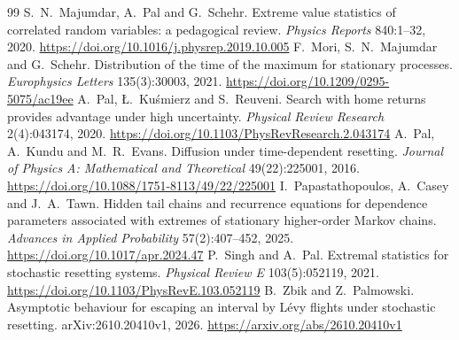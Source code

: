 \documentclass[11pt,a4paper]{article}
\begin{document}
\begin{thebibliography}{99}
 S.~N.~Majumdar, A.~Pal and G.~Schehr. Extreme value statistics of correlated random variables: a pedagogical review. \emph{Physics Reports} 840:1--32, 2020. \url{https://doi.org/10.1016/j.physrep.2019.10.005}
 F.~Mori, S.~N.~Majumdar and G.~Schehr. Distribution of the time of the maximum for stationary processes. \emph{Europhysics Letters} 135(3):30003, 2021. \url{https://doi.org/10.1209/0295-5075/ac19ee}
 A.~Pal, \L.~Ku\'smierz and S.~Reuveni. Search with home returns provides advantage under high uncertainty. \emph{Physical Review Research} 2(4):043174, 2020. \url{https://doi.org/10.1103/PhysRevResearch.2.043174}
 A.~Pal, A.~Kundu and M.~R.~Evans. Diffusion under time-dependent resetting. \emph{Journal of Physics A: Mathematical and Theoretical} 49(22):225001, 2016. \url{https://doi.org/10.1088/1751-8113/49/22/225001}
 I.~Papastathopoulos, A.~Casey and J.~A.~Tawn. Hidden tail chains and recurrence equations for dependence parameters associated with extremes of stationary higher-order Markov chains. \emph{Advances in Applied Probability} 57(2):407--452, 2025. \url{https://doi.org/10.1017/apr.2024.47}
 P.~Singh and A.~Pal. Extremal statistics for stochastic resetting systems. \emph{Physical Review E} 103(5):052119, 2021. \url{https://doi.org/10.1103/PhysRevE.103.052119}
 B.~Zbik and Z.~Palmowski. Asymptotic behaviour for escaping an interval by L\'evy flights under stochastic resetting. arXiv:2610.20410v1, 2026. \url{https://arxiv.org/abs/2610.20410v1}
\end{thebibliography}
\end{document}
